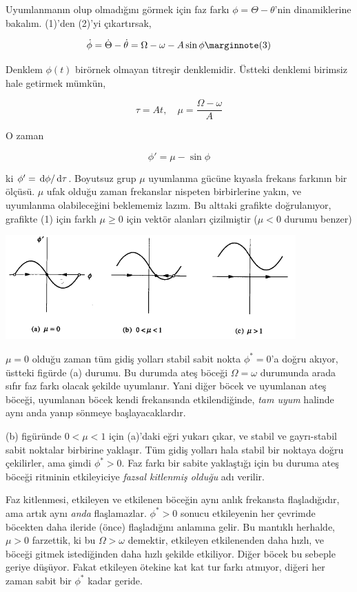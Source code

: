 \documentclass[12pt,fleqn]{article}\usepackage{../../common}
\begin{document}
Uyumlanmanın olup olmadığını görmek için faz farkı $\phi = \Theta - \theta$'nin
dinamiklerine bakalım. (1)'den (2)'yi çıkartırsak,

$$
\dot{\phi} = \dot{\Theta} - \dot{\theta} = \Omega - \omega - A\sin\phi
\mlabel{3}
$$

Denklem $\phi(t)$ birörnek olmayan titreşir denklemidir. Üstteki denklemi
birimsiz hale getirmek mümkün,

$$ \tau = At, \quad \mu = \frac{\Omega - \omega}{A} $$

O zaman

$$ \phi' = \mu - \sin\phi $$

ki $\phi' = \,\mathrm{d}\phi/\,\mathrm{d}\tau$. Boyutsuz grup $\mu$ uyumlanma gücüne kıyasla
frekans farkının bir ölçüsü. $\mu$ ufak olduğu zaman frekanslar nispeten
birbirlerine yakın, ve uyumlanma olabileceğini beklememiz lazım. Bu alttaki
grafikte doğrulanıyor, grafikte (1) için farklı $\mu \ge 0$ için vektör alanları
çizilmiştir ($\mu < 0$ durumu benzer)

\includegraphics[height=4cm]{04_15.png}

$\mu=0$ olduğu zaman tüm gidiş yolları stabil sabit nokta $\phi^\ast=0$'a doğru
akıyor, üstteki figürde (a) durumu. Bu durumda ateş böceği $\Omega=\omega$
durumunda arada sıfır faz farkı olacak şekilde uyumlanır. Yani diğer böcek ve
uyumlanan ateş böceği, uyumlanan böcek kendi frekansında etkilendiğinde, {\em
  tam uyum} halinde aynı anda yanıp sönmeye başlayacaklardır.

(b) figüründe $0 < \mu < 1$ için (a)'daki eğri yukarı çıkar, ve stabil ve
gayrı-stabil sabit noktalar birbirine yaklaşır. Tüm gidiş yolları hala stabil
bir noktaya doğru çekilirler, ama şimdi $\phi^\ast>0$. Faz farkı bir sabite
yaklaştığı için bu duruma ateş böceği ritminin etkileyiciye {\em fazsal kitlenmiş
  olduğu} adı verilir.

Faz kitlenmesi, etkileyen ve etkilenen böceğin aynı anlık frekansta
flaşladığıdır, ama artık aynı {\em anda} flaşlamazlar. $\phi^\ast>0$ sonucu
etkileyenin her çevrimde böcekten daha ileride (önce) flaşladığını anlamına
gelir. Bu mantıklı herhalde, $\mu>0$ farzettik, ki bu $\Omega > \omega$
demektir, etkileyen etkilenenden daha hızlı, ve böceği gitmek istediğinden daha
hızlı şekilde etkiliyor. Diğer böcek bu sebeple geriye düşüyor. Fakat etkileyen
ötekine kat kat tur farkı atmıyor, diğeri her zaman sabit bir $\phi^\ast$ kadar
geride.
\end{document}
